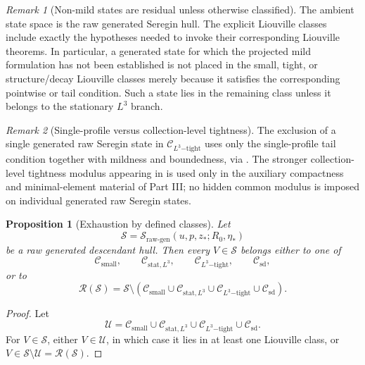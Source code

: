\documentclass[11pt]{amsart}
\theoremstyle{plain}
\newtheorem{proposition}[proposition]{Proposition}
\theoremstyle{definition}
\theoremstyle{remark}
\newtheorem{remark}[remark]{Remark}
\numberwithin{equation}{section}
\newcommand{\calS}{\mathcal S}
\newcommand{\calR}{\mathcal R}
\newcommand{\calC}{\mathcal C}
\newcommand{\calU}{\mathcal U}
\begin{document}
\begin{remark}[Non-mild states are residual unless otherwise classified]
The ambient state space is the raw generated Seregin hull.  The explicit
Liouville classes include exactly the hypotheses needed to invoke their
corresponding Liouville theorems.  In particular, a generated state for which
the projected mild formulation has not been established is not placed in the
small, tight, or structure/decay Liouville classes merely because it satisfies
the corresponding pointwise or tail condition.  Such a state lies in the
remaining class unless it belongs to the stationary \(L^3\) branch.
\end{remark}

\begin{remark}[Single-profile versus collection-level tightness]
\label{p1:rem:single-vs-collection}
The exclusion of a single generated raw Seregin state in
\(\calC_{L^3\mathrm{-tight}}\) uses only the single-profile tail condition
together with mildness and boundedness, via .  The stronger
collection-level tightness modulus appearing in
 is used only in the
auxiliary compactness and minimal-element material of Part III; no hidden common
modulus is imposed on individual generated raw Seregin states.
\end{remark}

\begin{proposition}[Exhaustion by defined classes]\label{p1:prop:exhaustion}
Let
\[
   \calS=\calS_{\mathrm{raw\text{-}gen}}(u,p,z_*;R_0,\eta_*)
\]
be a raw generated descendant hull.  Then every \(V\in\calS\) belongs either to
one of
\[
   \calC_{\mathrm{small}},\qquad
   \calC_{\mathrm{stat},L^3},\qquad
   \calC_{L^3\mathrm{-tight}},\qquad
   \calC_{\mathrm{sd}},
\]
or to
\[
   \calR(\calS)
   =
   \calS
   \setminus
   \left(
      \calC_{\mathrm{small}}
      \cup
      \calC_{\mathrm{stat},L^3}
      \cup
      \calC_{L^3\mathrm{-tight}}
      \cup
      \calC_{\mathrm{sd}}
   \right).
\]
\end{proposition}

\begin{proof}
Let
\[
   \calU=
      \calC_{\mathrm{small}}
      \cup
      \calC_{\mathrm{stat},L^3}
      \cup
      \calC_{L^3\mathrm{-tight}}
      \cup
      \calC_{\mathrm{sd}}.
\]
For \(V\in\calS\), either \(V\in\calU\), in which case it lies in at least one
Liouville class, or \(V\in\calS\setminus\calU=\calR(\calS)\).
\end{proof}
\end{document}
